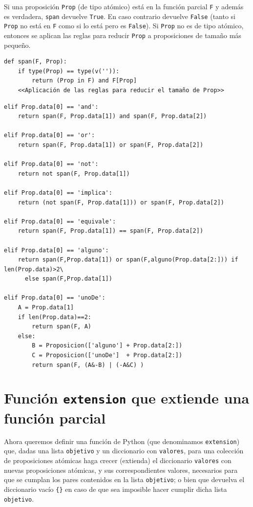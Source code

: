 \documentclass[10pt,a4paper]{report}
\begin{document}
Si una proposición \texttt{Prop} (de tipo atómico) está en la función parcial \texttt{F} y además es verdadera, \texttt{span} devuelve \texttt{True}.
En caso contrario devuelve \texttt{False} (tanto si \texttt{Prop} no está en \texttt{F} como si lo está pero es \texttt{False}).
Si \texttt{Prop} no es de tipo atómico, entonces se aplican las reglas para reducir \texttt{Prop} a proposiciones de tamaño más pequeño.

\begin{verbatim}
def span(F, Prop):
    if type(Prop) == type(v('')):
        return (Prop in F) and F[Prop]
    <<Aplicación de las reglas para reducir el tamaño de Prop>>

\end{verbatim}

\begin{verbatim}
elif Prop.data[0] == 'and':
    return span(F, Prop.data[1]) and span(F, Prop.data[2])

elif Prop.data[0] == 'or':
    return span(F, Prop.data[1]) or span(F, Prop.data[2])

elif Prop.data[0] == 'not':
    return not span(F, Prop.data[1])

elif Prop.data[0] == 'implica':
    return (not span(F, Prop.data[1])) or span(F, Prop.data[2])

elif Prop.data[0] == 'equivale':
    return span(F, Prop.data[1]) == span(F, Prop.data[2])

elif Prop.data[0] == 'alguno':
    return span(F,Prop.data[1]) or span(F,alguno(Prop.data[2:])) if len(Prop.data)>2\
      else span(F,Prop.data[1])

elif Prop.data[0] == 'unoDe':
    A = Prop.data[1]
    if len(Prop.data)==2:
        return span(F, A)
    else:
        B = Proposicion(['alguno'] + Prop.data[2:])
        C = Proposicion(['unoDe']  + Prop.data[2:])
        return span(F, (A&-B) | (-A&C) )
\end{verbatim}
\chapter{Función  \texttt{extension} que extiende una función parcial}
\label{sec:org707aa3c}

Ahora queremos definir una función de Python (que denominamos \texttt{extension}) que,
dadas una lista \texttt{objetivo} y un diccionario con \texttt{valores},
para una colección de proposiciones atómicas haga crecer (extienda) el diccionario \texttt{valores} con nuevas proposiciones atómicas, y sus correspondientes valores,
necesarios para que se cumplan los pares contenidos en la lista \texttt{objetivo};
o bien que devuelva el diccionario vacío \texttt{\{\}} en caso de que sea imposible hacer cumplir dicha lista \texttt{objetivo}.
\end{document}
